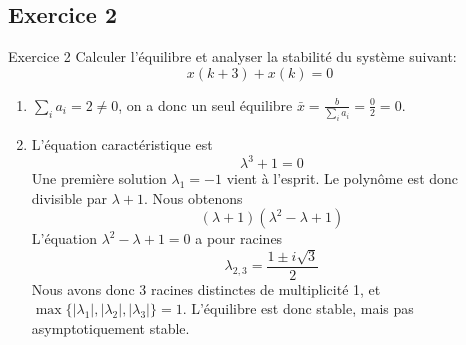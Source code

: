         \subsection{Exercice 2}
            \begin{exercise}{Exercice 2}
                Calculer l’équilibre et analyser la stabilité du système suivant:
                \begin{equation}
                    x(k+3)+x(k) = 0
                \end{equation}
            \end{exercise}
            \begin{enumerate}
                    \item $\sum_i a_i = 2 \neq 0$, on a donc un seul équilibre $\bar{x} = \frac{b}{\sum_i a_i} = \frac{0}{2} = 0$.
                    \item L’équation caractéristique est
                    \begin{equation}
                        \lambda^3+1 = 0
                    \end{equation}
                    Une première solution $\lambda_1 = -1$ vient à l’esprit. Le polynôme est donc divisible par $\lambda+1$. Nous obtenons
                    \begin{equation}
                        (\lambda+1)(\lambda^2-\lambda+1)
                    \end{equation}
                    L’équation $\lambda^2-\lambda+1 = 0$ a pour racines
                    \begin{equation}
                        \lambda_{2,3} = \frac{1 \pm i\sqrt{3}}{2}
                    \end{equation}
                    Nous avons donc 3 racines distinctes de multiplicité 1, et \break
                    $\max\{|\lambda_1|, |\lambda_2|, |\lambda_3|\} = 1$. L’équilibre est donc stable, mais pas asymptotiquement stable.
                \end{enumerate}

